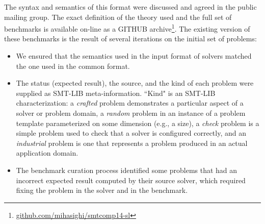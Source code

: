 \documentclass[twoside,11pt]{article}
\newcommand{\SLEEK}{\textsc{Sleek}}
\begin{document}
The syntax and semantics of this format were discussed and agreed in the public mailing group. 
The exact definition of the theory used and the full set of benchmarks is available on-line as a GITHUB archive\footnote{\url{github.com/mihasighi/smtcomp14-sl}}.
The existing version of these benchmarks is the result of several iterations on the initial set of problems:
\begin{itemize}
\item We ensured that the semantics used in the input format of solvers matched the one used in the common format. 
\item The status (expected result), the source, and the kind of each problem were supplied as SMT-LIB meta-information. ``Kind" is an SMT-LIB characterization: a \textit{crafted} problem demonstrates a particular aspect of a solver or problem domain, a \textit{random} problem in an instance of a problem template parameterized on some dimension (e.g., a size), a \textit{check} problem is a simple problem used to check that a solver is configured correctly, and an \textit{industrial} problem is one that represents a problem produced in an actual application domain.
\item The benchmark curation process identified some problems that had an incorrect expected result computed by their source solver, which required fixing the problem in the solver and in the benchmark.
\end{itemize}
\end{document}
